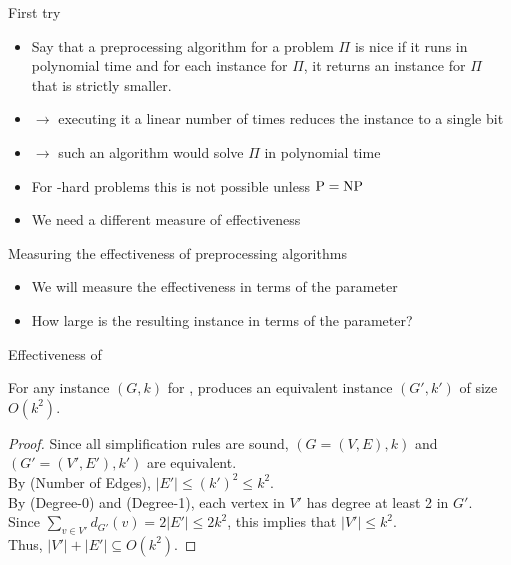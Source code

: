 \begin{frame}{First try}

	\begin{itemize}
		\item Say that a preprocessing algorithm for a problem $\Pi$ is \alert{nice}
		      if it runs in polynomial time and
		      for each instance for $\Pi$, it returns an instance for $\Pi$ that is strictly smaller.
		      \pause
		\item $\rightarrow$ executing it a linear number of times reduces the instance to a single bit
		\item $\rightarrow$ such an algorithm would solve $\Pi$ in polynomial time
		\item For \NP-hard problems this is not possible unless $\text{\normalfont {P}} = \text{\normalfont {NP}}$
		\item We need a different measure of effectiveness
	\end{itemize}

\end{frame}


\begin{frame}{Measuring the effectiveness of preprocessing algorithms}
	\begin{itemize}
		\item We will measure the effectiveness in terms of the \alert{parameter}
		\item How large is the resulting instance in terms of the parameter?
	\end{itemize}
\end{frame}


\begin{frame}{Effectiveness of \vcpre}
	\begin{lemma}
		For any instance $(G,k)$ for \VC, \vcpre produces an equivalent instance $(G',k')$ of size $O(k^2)$.
	\end{lemma}
	\begin{proof}
		Since all simplification rules are sound, $(G=(V,E),k)$ and $(G'=(V',E'),k')$ are equivalent.\\
		By (Number of Edges), $|E'|\le (k')^2 \le k^2$.\\
		By (Degree-0) and (Degree-1), each vertex in $V'$ has degree at least 2 in $G'$.\\
		Since $\sum_{v\in V'} d_{G'}(v) = 2 |E'| \le 2k^2$, this implies that $|V'|\le k^2$.\\
		Thus, $|V'|+|E'| \subseteq O(k^2)$.
	\end{proof}
\end{frame}

